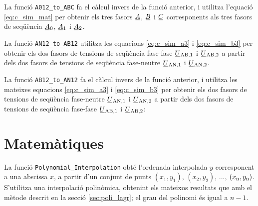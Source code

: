 


La funció \texttt{A012\_to\_ABC} fa el càlcul  invers de la funció anterior, i utilitza l'equació \eqref{eq:c_sim_mat} per obtenir els tres fasors
$\cmplx{A}$, $\cmplx{B}$ i $\cmplx{C}$  corresponents als tres fasors de seqüència
$\cmplx{A}_0$, $\cmplx{A}_1$ i  $\cmplx{A}_2$.




La funció \texttt{AN12\_to\_AB12} utilitza les equacions  \eqref{eq:c_sim_a3} i \eqref{eq:c_sim_b3} per obtenir els dos fasors de tensions de seqüència fase-fase $\cmplx{U}\ped{AB,1}$ i  $\cmplx{U}\ped{AB,2}$ a partir dels dos fasors de tensions de seqüència fase-neutre $\cmplx{U}\ped{AN,1}$ i $\cmplx{U}\ped{AN,2}$.




La funció \texttt{AB12\_to\_AN12} fa el càlcul invers de la funció anterior, i utilitza les mateixes equacions  \eqref{eq:c_sim_a3} i \eqref{eq:c_sim_b3} per obtenir els dos fasors de tensions de seqüència fase-neutre $\cmplx{U}\ped{AN,1}$ i $\cmplx{U}\ped{AN,2}$ a partir dels dos fasors de tensions de seqüència fase-fase $\cmplx{U}\ped{AB,1}$ i  $\cmplx{U}\ped{AB,2}$:




\section{Matemàtiques}\label{sec:HP_MATH}

La funció \texttt{Polynomial\_Interpolation} obté l'ordenada interpolada $y$ corresponent a una abscissa $x$, a partir d'un conjunt  de punts $(x_1,y_1)$, $(x_2,y_2)$, ..., $(x_\mathrm{n},y_\mathrm{n})$. S'utilitza una interpolació polinòmica, obtenint els mateixos resultats que amb el mètode descrit en la secció \vref{sec:poli_lagr}; el grau del polinomi és igual a $n-1$.

